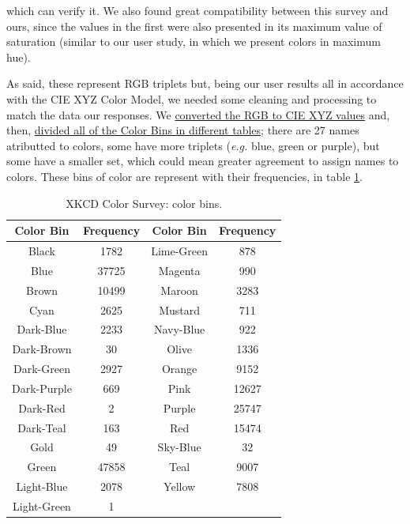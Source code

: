 which can verify it. We also found great compatibility between this survey and ours, since the values in the first were also presented in its maximum value of saturation (similar to our user study, in which we present colors in maximum hue).  \par
As said, these represent \gls{RGB} triplets but, being our user results all in accordance with the CIE XYZ Color Model, we needed some cleaning and processing to match the data our
responses. We \ul{converted the RGB to CIE XYZ values} and, then, \ul{divided all of the Color Bins in different tables}; there are 27 names atributted to colors, some have more triplets
(\emph{e.g.} blue, green or purple), but some have a smaller set, which could mean greater agreement to assign names to colors. These bins of color are represent with their frequencies, in table
\ref{table:colorbins}. \par
%
\begin{table}[htbp]
  \begin{center}
    \begin{tabular} {| c | c || c | c |}
      \hline
      Color Bin   &   Frequency   &   Color Bin   &   Frequency \\ \hline \hline
      Black       &   1782        &   Lime-Green  &   878 \\ \hline
      Blue        &   37725       &   Magenta     &   990 \\ \hline
      Brown       &   10499       &   Maroon      &   3283\\ \hline
      Cyan        &   2625        &   Mustard     &   711 \\ \hline
      Dark-Blue   &   2233        &   Navy-Blue   &   922 \\ \hline
      Dark-Brown  &   30          &   Olive       &   1336 \\ \hline
      Dark-Green  &   2927        &   Orange      &   9152 \\ \hline
      Dark-Purple &   669         &   Pink        &   12627 \\ \hline
      Dark-Red    &   2           &   Purple      &   25747 \\ \hline
      Dark-Teal   &   163         &   Red         &   15474 \\ \hline
      Gold        &   49          &   Sky-Blue    &   32 \\ \hline
      Green       &   47858       &   Teal        &   9007 \\ \hline
      Light-Blue  &   2078        &   Yellow      &   7808 \\ \hline
      Light-Green &   1           &   \-          &   \- \\
      \hline
    \end{tabular}
  \end{center}
  \caption[XKCD Color Survey: Color Bins]{XKCD Color Survey: color bins.}
  \label{table:colorbins}
\end{table}
